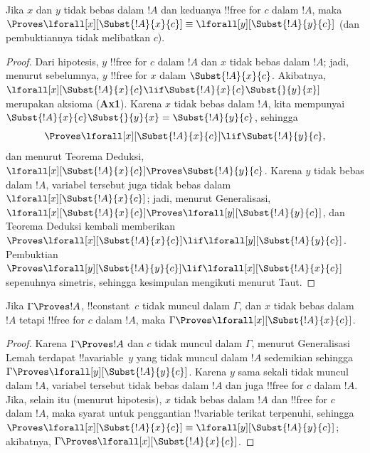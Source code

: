 \documentclass[../../../include/open-logic-section]{subfiles}
\begin{document}
\begin{lem}
Jika $x$ dan $y$ tidak bebas dalam $!A$ dan keduanya !!{free for} $c$
dalam $!A$, maka $\Proves \lforall[x][\Subst{!A}{x}{c}] \equiv
\lforall[y][\Subst{!A}{y}{c}]$ (dan pembuktiannya tidak melibatkan $c$).
\end{lem}

\begin{proof}
Dari hipotesis, $y$ !!{free for} $c$ dalam $!A$ dan $x$ tidak bebas dalam
$!A$; jadi, menurut  sebelumnya, $y$ !!{free for} $x$
dalam $\Subst{!A}{x}{c}$. Akibatnya,
$\lforall[x][\Subst{!A}{x}{c} \lif \Subst{!A}{x}{c} \Subst{}{y}{x}]$
merupakan aksioma (\textbf{Ax1}). Karena $x$ tidak bebas dalam $!A$, kita
mempunyai
$\Subst{!A}{x}{c} \Subst{}{y}{x} = \Subst{!A}{y}{c}$, sehingga
\[
\Proves \lforall[x][\Subst{!A}{x}{c}] \lif \Subst{!A}{y}{c},
\]
dan menurut Teorema Deduksi,
$\lforall[x][\Subst{!A}{x}{c}] \Proves \Subst{!A}{y}{c}$. Karena $y$
tidak bebas dalam $!A$, variabel tersebut juga tidak bebas dalam
$\lforall[x][\Subst{!A}{x}{c}]$; jadi, menurut Generalisasi,
$\lforall[x][\Subst{!A}{x}{c}] \Proves
\lforall[y][\Subst{!A}{y}{c}]$, dan Teorema Deduksi kembali memberikan
$\Proves \lforall[x][\Subst{!A}{x}{c}] \lif
\lforall[y][\Subst{!A}{y}{c}]$. Pembuktian
$\Proves \lforall[y][\Subst{!A}{y}{c}] \lif
\lforall[x][\Subst{!A}{x}{c}]$ sepenuhnya simetris, sehingga kesimpulan
mengikuti menurut Taut.
\end{proof}

\begin{thm}
Jika $\Gamma \Proves !A$, !!{constant}~$c$ tidak muncul dalam $\Gamma$,
dan $x$ tidak bebas dalam $!A$ tetapi !!{free for} $c$ dalam $!A$, maka
$\Gamma \Proves \lforall[x][\Subst{!A}{x}{c}]$.
\end{thm}

\begin{proof}
Karena $\Gamma \Proves !A$ dan $c$ tidak muncul dalam $\Gamma$, menurut
Generalisasi Lemah terdapat !!a{variable}~$y$ yang tidak muncul dalam $!A$
sedemikian sehingga $\Gamma \Proves \lforall[y][\Subst{!A}{y}{c}]$.
Karena $y$ sama sekali tidak muncul dalam $!A$, variabel tersebut tidak bebas dalam $!A$
dan juga !!{free for} $c$ dalam $!A$. Jika, selain itu (menurut hipotesis),
$x$ tidak bebas dalam $!A$ dan !!{free for} $c$ dalam $!A$, maka syarat
untuk penggantian !!{variable} terikat terpenuhi, sehingga
$\Proves \lforall[x][\Subst{!A}{x}{c}] \equiv
\lforall[y][\Subst{!A}{y}{c}]$; akibatnya,
$\Gamma \Proves \lforall[x][\Subst{!A}{x}{c}]$.
\end{proof}
\end{document}
